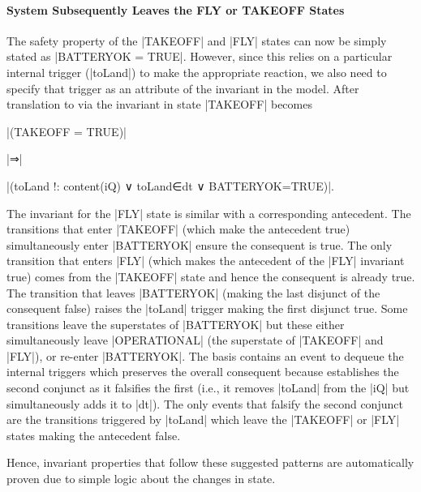 \paragraph{System Subsequently Leaves the FLY or TAKEOFF States}
The safety property of the |TAKEOFF| and |FLY| states can now be simply stated as |BATTERYOK = TRUE|. 
However, since this relies on a particular internal trigger (|toLand|) to make the appropriate reaction, we also need to specify that trigger as an attribute of the invariant in the \SCXML model.
After translation to \EVENTB via \UMLB the invariant in state |TAKEOFF| becomes 

\begin{center}
  |(TAKEOFF = TRUE)|

  |⇒|

  |(toLand !: content(iQ) ∨ toLand∈dt ∨ BATTERYOK=TRUE)|.
\end{center}

The invariant for the |FLY| state is similar with a corresponding antecedent.
The transitions that enter |TAKEOFF| (which make the antecedent true) simultaneously enter |BATTERYOK| ensure the consequent is true.
The only transition that enters |FLY| (which makes the antecedent of the |FLY| invariant true) comes from the |TAKEOFF| state and hence the consequent is already true.
The transition that leaves |BATTERYOK| (making the last disjunct of the consequent false) raises the |toLand| trigger making the first disjunct true.
Some transitions leave the superstates of |BATTERYOK| but these either simultaneously leave |OPERATIONAL| (the superstate of |TAKEOFF| and |FLY|), or re-enter |BATTERYOK|.
The basis contains an event to dequeue the internal triggers which preserves the overall consequent because establishes the second conjunct as it falsifies the first (i.e., it removes |toLand| from the |iQ| but simultaneously adds it to |dt|).
The only events that falsify the second conjunct are the transitions triggered by |toLand| which leave the |TAKEOFF| or |FLY| states making the antecedent false.

Hence, invariant properties that follow these suggested patterns are automatically proven due to simple logic about the changes in state.


